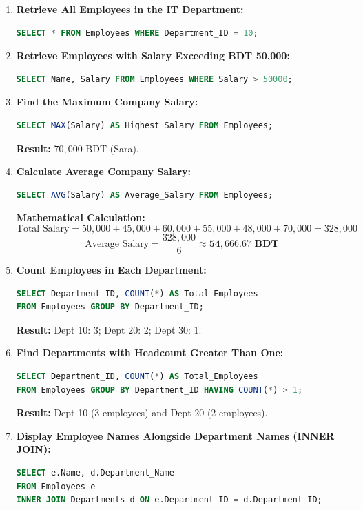 \begin{enumerate}[label=\textbf{Problem \arabic*.},leftmargin=1.5cm]
\item \textbf{Retrieve All Employees in the IT Department:}
\begin{lstlisting}[language=SQL]
SELECT * FROM Employees WHERE Department_ID = 10;
\end{lstlisting}

\item \textbf{Retrieve Employees with Salary Exceeding BDT 50,000:}
\begin{lstlisting}[language=SQL]
SELECT Name, Salary FROM Employees WHERE Salary > 50000;
\end{lstlisting}

\item \textbf{Find the Maximum Company Salary:}
\begin{lstlisting}[language=SQL]
SELECT MAX(Salary) AS Highest_Salary FROM Employees;
\end{lstlisting}
\textbf{Result:} $\boxed{70,000\text{ BDT}}$ (Sara).

\item \textbf{Calculate Average Company Salary:}
\begin{lstlisting}[language=SQL]
SELECT AVG(Salary) AS Average_Salary FROM Employees;
\end{lstlisting}
\textbf{Mathematical Calculation:}
\[
\text{Total Salary} = 50,000 + 45,000 + 60,000 + 55,000 + 48,000 + 70,000 = 328,000
\]
\[
\text{Average Salary} = \frac{328,000}{6} \approx \mathbf{54,666.67\text{ BDT}}
\]

\item \textbf{Count Employees in Each Department:}
\begin{lstlisting}[language=SQL]
SELECT Department_ID, COUNT(*) AS Total_Employees
FROM Employees GROUP BY Department_ID;
\end{lstlisting}
\textbf{Result:} Dept 10: 3; Dept 20: 2; Dept 30: 1.

\item \textbf{Find Departments with Headcount Greater Than One:}
\begin{lstlisting}[language=SQL]
SELECT Department_ID, COUNT(*) AS Total_Employees
FROM Employees GROUP BY Department_ID HAVING COUNT(*) > 1;
\end{lstlisting}
\textbf{Result:} Dept 10 (3 employees) and Dept 20 (2 employees).

\item \textbf{Display Employee Names Alongside Department Names (INNER JOIN):}
\begin{lstlisting}[language=SQL]
SELECT e.Name, d.Department_Name
FROM Employees e
INNER JOIN Departments d ON e.Department_ID = d.Department_ID;
\end{lstlisting}


\end{enumerate}
